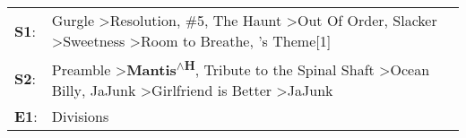 \begin{supertabular}{p{0.03\textwidth}p{0.92\textwidth}}
 \textbf{S1}:  &  Gurgle\textsuperscript{} \textgreater \enspace Resolution\textsuperscript{}, \enspace \#5\textsuperscript{}, \enspace The Haunt\textsuperscript{} \textgreater \enspace Out Of Order\textsuperscript{}, \enspace Slacker\textsuperscript{} \textgreater \enspace Sweetness\textsuperscript{} \textgreater \enspace Room to Breathe\textsuperscript{}, 's Theme[1]\textsuperscript{}  \enspace  \\
 \textbf{S2}:  &                                          Preamble\textsuperscript{} \textgreater \enspace \textbf{Mantis\textsuperscript{$\wedge$H}}, \enspace Tribute to the Spinal Shaft\textsuperscript{} \textgreater \enspace Ocean Billy\textsuperscript{}, \enspace JaJunk\textsuperscript{} \textgreater \enspace Girlfriend is Better\textsuperscript{} \textgreater \enspace JaJunk\textsuperscript{}  \enspace  \\
 \textbf{E1}:  &                                                                                                                                                                                                                                                                                                                                                                     Divisions\textsuperscript{}  \enspace  \\
\end{supertabular}
